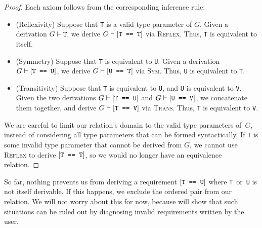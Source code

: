 \documentclass[../generics]{subfiles}
\begin{document}
\begin{proof}
Each axiom follows from the corresponding inference rule:
\begin{itemize}
\item
(Reflexivity) Suppose that \texttt{T} is a valid type parameter of $G$. Given a derivation $G\vdash\texttt{T}$, we derive $G\vdash[\texttt{T == T}]$ via \textsc{Reflex}. Thus, \texttt{T} is equivalent to itself.
\item
(Symmetry) Suppose that \texttt{T} is equivalent to \texttt{U}. Given a derivation $G\vdash[\texttt{T == U}]$, we derive $G\vdash[\texttt{U == T}]$ via \textsc{Sym}. Thus, \texttt{U} is equivalent to \texttt{T}.
\item
(Transitivity) Suppose that \texttt{T} is equivalent to \texttt{U}, and \texttt{U} is equivalent to \texttt{V}. Given the two derivations $G\vdash[\texttt{T == U}]$ and $G\vdash[\texttt{U == V}]$, we concatenate them together, and derive $G\vdash[\texttt{T == V}]$ via \textsc{Trans}. Thus, \texttt{T} is equivalent to \texttt{V}.
\end{itemize}

We are careful to limit our relation's domain to the valid type parameters of~$G$, instead of considering all type parameters that can be formed syntactically. If \texttt{T} is some invalid type parameter that cannot be derived from $G$, we cannot use \textsc{Reflex} to derive $[\texttt{T == T}]$, so we would no longer have an equivalence relation.
\end{proof}

So far, nothing prevents us from deriving a requirement $[\texttt{T == U}]$ where \texttt{T}~or~\texttt{U} is not itself derivable. If this happens, we exclude the ordered pair from our relation. We will not worry about this for now, because  will show that such situations can be ruled out by diagnosing invalid requirements written by the user.
\end{document}
